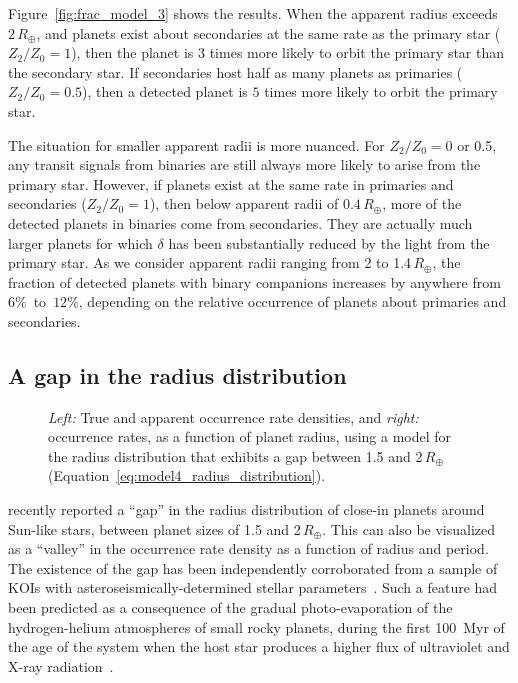 \documentclass[12pt,modern]{aastex61}
\begin{document}
Figure~\ref{fig:frac_model_3} shows the results.  When the apparent
radius exceeds $2\,R_\oplus$, and planets exist about secondaries at
the same rate as the primary star ($Z_2/Z_0=1$), then the planet is
$3$ times more likely to orbit the primary star than the secondary
star.  If secondaries host half as many planets as primaries
($Z_2/Z_0=0.5$), then a detected planet is $5$ times more likely to
orbit the primary star.

The situation for smaller apparent radii is more nuanced.  For
$Z_2/Z_0=0$ or 0.5, any transit signals from binaries are still always
more likely to arise from the primary star.  However, if planets exist
at the same rate in primaries and secondaries ($Z_2/Z_0=1$), then
below apparent radii of $0.4\,R_\oplus$, more of the detected planets
in binaries come from secondaries.  They are actually much larger
planets for which $\delta$ has been substantially reduced by the light
from the primary star.  As we consider apparent radii ranging from 2
to 1.4\,$R_\oplus$, the fraction of detected planets with binary
companions increases by anywhere from $6\%$~to~$12\%$, depending on
the relative occurrence of planets about primaries and secondaries.


\subsection{A gap in the radius distribution}
\label{sec:further_models}

\begin{figure}[!t]
    \centering
    \caption{ {\it Left:} True and apparent occurrence rate densities,
      and {\it right:} occurrence rates, as a function of planet
      radius, using a model for the radius distribution that exhibits
      a gap between 1.5 and 2\,$R_\oplus$
      (Equation~\ref{eq:model4_radius_distribution}). }
    \label{fig:model_4}
\end{figure}

\citet{fulton_california-_2017} recently reported a ``gap'' in the
radius distribution of close-in planets around Sun-like stars, between
planet sizes of 1.5 and 2\,$R_\oplus$.  This can also be visualized as
a ``valley'' in the occurrence rate density as a function of radius
and period.  The existence of the gap has been independently
corroborated from a sample of KOIs with asteroseismically-determined
stellar parameters~\citep{van_eylen_asteroseismic_2017}.  Such a
feature had been predicted as a consequence of the gradual
photo-evaporation of the hydrogen-helium atmospheres of small rocky
planets, during the first 100~Myr of the age of the system when the
host star produces a higher flux of ultraviolet and X-ray
radiation~\citep{owen_evaporation_2017}.
\end{document}
